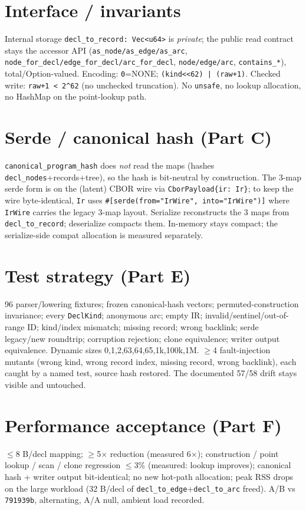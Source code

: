 \documentclass[11pt]{article}
\begin{document}
\section*{Interface / invariants}
Internal storage \texttt{decl\_to\_record: Vec<u64>} is \emph{private}; the public read
contract stays the accessor API (\texttt{as\_node/as\_edge/as\_arc},
\texttt{node\_for\_decl/edge\_for\_decl/arc\_for\_decl}, \texttt{node/edge/arc},
\texttt{contains\_*}), total/Option-valued. Encoding: \texttt{0}=NONE;
\texttt{(kind<<62) | (raw+1)}. Checked write: \texttt{raw+1 < 2\^{}62} (no unchecked
truncation). No \texttt{unsafe}, no lookup allocation, no HashMap on the point-lookup path.

\section*{Serde / canonical hash (Part C)}
\texttt{canonical\_program\_hash} does \emph{not} read the maps (hashes
\texttt{decl\_nodes}+records+tree), so the hash is bit-neutral by construction. The 3-map
serde form is on the (latent) CBOR wire via \texttt{CborPayload\{ir: Ir\}}; to keep the
wire byte-identical, \texttt{Ir} uses \texttt{\#[serde(from="IrWire", into="IrWire")]}
where \texttt{IrWire} carries the legacy 3-map layout. Serialize reconstructs the 3 maps
from \texttt{decl\_to\_record}; deserialize compacts them. In-memory stays compact; the
serialize-side compat allocation is measured separately.

\section*{Test strategy (Part E)}
96 parser/lowering fixtures; frozen canonical-hash vectors; permuted-construction
invariance; every \texttt{DeclKind}; anonymous arc; empty IR; invalid/sentinel/out-of-range
ID; kind/index mismatch; missing record; wrong backlink; serde legacy/new roundtrip;
corruption rejection; clone equivalence; writer output equivalence. Dynamic sizes
0,1,2,63,64,65,1k,100k,1M. $\geq$4 fault-injection mutants (wrong kind, wrong record index,
missing record, wrong backlink), each caught by a named test, source hash restored. The
documented 57/58 drift stays visible and untouched.

\section*{Performance acceptance (Part F)}
$\leq$8 B/decl mapping; $\geq$5$\times$ reduction (measured 6$\times$); construction / point
lookup / scan / clone regression $\leq$3\% (measured: lookup improves); canonical hash +
writer output bit-identical; no new hot-path allocation; peak RSS drops on the large
workload (32 B/decl of \texttt{decl\_to\_edge}+\texttt{decl\_to\_arc} freed). A/B vs
\texttt{791939b}, alternating, A/A null, ambient load recorded.
\end{document}

